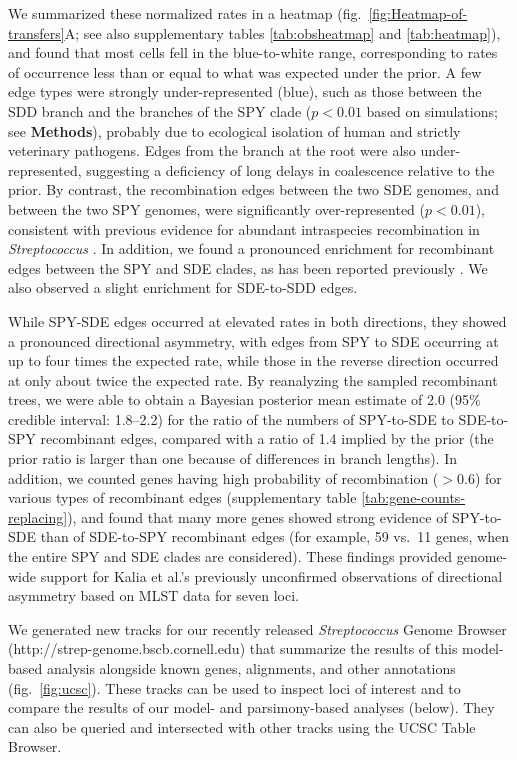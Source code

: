 \documentclass[12pt]{article}
\begin{document}
We summarized these normalized rates in a heatmap (fig.\
\ref{fig:Heatmap-of-transfers}A; see also supplementary tables
\ref{tab:obsheatmap} and \ref{tab:heatmap}), and found that most cells
fell in the blue-to-white range, corresponding to rates of occurrence less
than or equal to what was expected under the prior.  A few edge types were
strongly under-represented (blue), such as those between the SDD branch and
the branches of the SPY clade ($p<0.01$ based on simulations; see
\textbf{Methods}), probably due to ecological isolation of human and
strictly veterinary pathogens.  Edges from the branch at the root were also
under-represented, suggesting a deficiency of long delays in coalescence
relative to the prior.  By contrast, the recombination edges between the
two SDE genomes, and between the two SPY genomes, were significantly
over-represented ($p<0.01$), consistent with previous evidence for abundant
intraspecies recombination in {\em Streptococcus} \citep{Feil2001}.  In
addition, we found a pronounced enrichment for recombinant edges between
the SPY and SDE clades, as has been reported previously
\citep{Kalia2001,Sachse2002,Kalia2004,Davies2005,Davies2007a}.  We also
observed a slight enrichment for SDE-to-SDD edges.

While SPY-SDE edges occurred at elevated rates in both directions, they
showed a pronounced directional asymmetry, with edges from SPY to SDE
occurring at up to four times the expected rate, while those in the reverse
direction occurred at only about twice the expected rate.  By reanalyzing
the sampled recombinant trees, we were able to obtain a Bayesian posterior
mean estimate of 2.0 (95\% credible interval: 1.8--2.2) for the ratio of the
numbers of SPY-to-SDE to SDE-to-SPY recombinant edges, compared with a ratio of 1.4
implied by the prior (the prior ratio is larger than one because of
differences in branch lengths).  In addition, we counted genes having high
probability of recombination ($>$0.6) for various types of recombinant
edges (supplementary table \ref{tab:gene-counts-replacing}), and found
that many more genes showed strong evidence of SPY-to-SDE than of SDE-to-SPY
recombinant edges (for example, 59 vs.\ 11 genes, when the entire SPY and
SDE clades are considered).  These findings provided genome-wide support
for Kalia et al.'s \citeyearpar{Kalia2001} previously unconfirmed
observations of directional asymmetry based on MLST data for seven loci.

We generated new tracks for our recently released {\em Streptococcus}
Genome Browser (http://strep-genome.bscb.cornell.edu) that summarize the
results of this model-based analysis alongside known genes, alignments, and
other annotations (fig.\ \ref{fig:ucsc}).  These tracks can be used to
inspect loci of interest and to compare the results of our model- and
parsimony-based analyses (below).  They can also be queried and intersected
with other tracks using the UCSC Table Browser.
\end{document}
